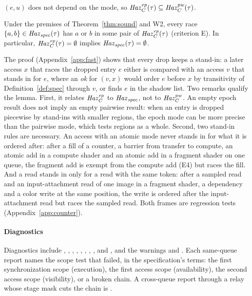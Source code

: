 \begin{lemma}[Modes]\label{lem:modes}
$(e,u)$ does not depend on the mode, so $\mathit{Haz}_C^{\mathit{ep}}(\tau) \subseteq \mathit{Haz}_C^{\mathit{pw}}(\tau)$.
\end{lemma}

\begin{lemma}\label{lem:fast}
Under the premises of Theorem~\ref{thm:sound} and W2, every race $\{a,b\} \in \mathit{Haz}_{\mathit{spec}}(\tau)$ has $a$ or $b$ in
some pair of $\mathit{Haz}_C^{\mathit{ep}}(\tau)$ (criterion E). In particular, $\mathit{Haz}_C^{\mathit{ep}}(\tau) = \emptyset$ implies $\mathit{Haz}_{\mathit{spec}}(\tau) = \emptyset$.
\end{lemma}

The proof (Appendix~\ref{app:fast}) shows that every drop keeps a stand-in: a later access $x$ that races the dropped
entry $e$ either is compared with an access $v$ that stands in for $e$, where an \emph{ok} for $(v,x)$ would order $e$
before $x$ by transitivity of Definition~\ref{def:spec} through $v$, or finds $e$ in the shadow list. Two remarks
qualify the lemma. First, it relates $\mathit{Haz}_C^{\mathit{ep}}$ to $\mathit{Haz}_{\mathit{spec}}$, not to $\mathit{Haz}_C^{\mathit{pw}}$. An empty epoch result does not imply an empty
pairwise result: when an entry is dropped piecewise by stand-ins with smaller regions, the epoch mode can be more
precise than the pairwise mode, which tests regions as a whole. Second, two stand-in rules are necessary. An access
with an atomic mode never stands in for what it is ordered after: after a fill of a counter, a barrier from transfer
to compute, an atomic add in a compute shader and an atomic add in a fragment shader on one queue, the fragment add is
exempt from the compute add (E4) but races the fill. And a read stands in only for a read with the same token: after a
sampled read and an input-attachment read of one image in a fragment shader, a  dependency and a
color write at the same position, the write is ordered after the input-attachment read but races the sampled read.
Both frames are regression tests (Appendix~\ref{app:counter}).

\paragraph{Diagnostics}
\begin{sloppypar}
Diagnostics include , , ,
, , , , ,
 and , and the warnings  and
. Each same-queue report names the
scope test that failed, in the specification's terms: the first synchronization scope (execution), the first access
scope (availability), the second access scope (visibility), or a broken chain. A cross-queue report through a relay
whose stage mask cuts the chain is .
\end{sloppypar}

